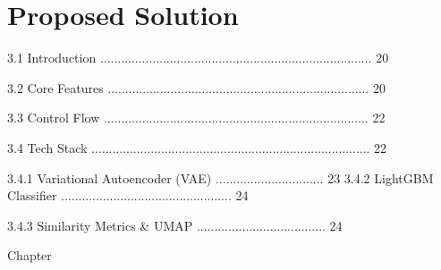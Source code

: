 \chapter{Proposed Solution}
3.1 Introduction .............................................................................. 20 

3.2 Core Features ........................................................................... 20 

3.3 Control Flow ............................................................................ 22 

3.4 Tech Stack ................................................................................ 22 

3.4.1 Variational Autoencoder (VAE) ............................... 23 3.4.2 LightGBM Classifier ................................................. 24 

3.4.3 Similarity Metrics \& UMAP ..................................... 24 

Chapter